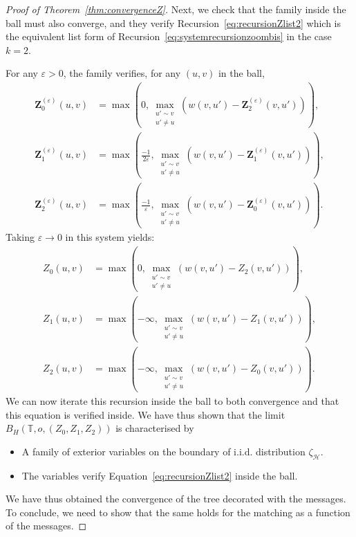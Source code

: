 \documentclass[11pt]{article}
\newcommand{\eps}{\varepsilon}
\begin{document}
\begin{proof}[Proof of Theorem~\ref{thm:convergenceZ}]
     Next, we check that the family inside the ball must also converge, and they verify Recursion~\eqref{eq:recursionZlist2} which is the equivalent list form of Recursion~\eqref{eq:systemrecursionzoombis} in the case $k=2$.

     For any $\eps>0$, the family verifies, for any $(u,v)$ in the ball,
     \begin{equation}
         \begin{aligned}
             \mathbf{Z}_0^{(\eps)}(u,v)&=\max\left(0, \max_{\substack{u' \sim v \\ u' \neq u}} (w(v,u')-\mathbf{Z}_2^{(\eps)}(v,u')) \right), \\
             \mathbf{Z}_1^{(\eps)}(u,v)&=\max\left(\frac{-1}{2\eps}, \max_{\substack{u' \sim v \\ u' \neq u}} (w(v,u')-\mathbf{Z}_1^{(\eps)}(v,u')) \right), \\
             \mathbf{Z}_2^{(\eps)}(u,v)&=\max\left(\frac{-1}{\eps}, \max_{\substack{u' \sim v \\ u' \neq u}} (w(v,u')-\mathbf{Z}_0^{(\eps)}(v,u')) \right).
         \end{aligned}
     \end{equation}
     Taking $\eps \to 0$ in this system yields:
     \begin{equation}
         \begin{aligned}
             Z_0(u,v)&=\max\left(0, \max_{\substack{u' \sim v \\ u' \neq u}} (w(v,u')-Z_2^{}(v,u')) \right), \\
             Z_1(u,v)&=\max\left(-\infty, \max_{\substack{u' \sim v \\ u' \neq u}} (w(v,u')-Z_1(v,u')) \right), \\
             Z_2(u,v)&=\max\left(-\infty, \max_{\substack{u' \sim v \\ u' \neq u}} (w(v,u')-Z_0(v,u')) \right).
         \end{aligned}
     \end{equation}
    We can now iterate this recursion inside the ball to both convergence and that this equation is verified inside.
    We have thus shown that the limit $B_H(\mathbb{T},o,(Z_0,Z_1,Z_2))$ is characterised by 
     \begin{itemize}
         \item A family of exterior variables on the boundary of i.i.d. distribution $\zeta_{\mathcal{H}}$.
         \item The variables verify Equation~\eqref{eq:recursionZlist2} inside the ball.
     \end{itemize}
    We have thus obtained the convergence of the tree decorated with the messages.
    To conclude, we need to show that the same holds for the matching as a function of the messages.


\end{proof}
\end{document}
